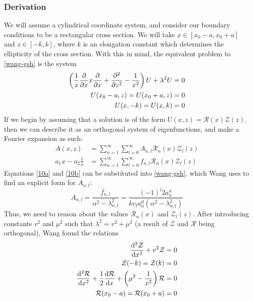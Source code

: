 \subsubsection{Derivation}
We will assume a cylindrical coordinate system, and consider our boundary conditions to be a rectangular cross section. We will 
take $x \in [x_0 - a, x_0 + a]$ and $z \in [-k, k]$, where $k$ is an elongation constant which determines the ellipticity of the cross section. 
With this in mind, the equivalent problem to \ref{wang-gsh} is the system
\begin{align}
    \label{4a} \left ( \frac{1}{x} \pdv{x} x \pdv{x} + \pdv[2]{z} - \frac{1}{x^2} \right ) U + \lambda^2 U &= 0 \\
    \label{4b} U(x_0 - a, z) = U(x_0 + a, z) &= 0 \\
    \label{4c} U(x, -k) = U(x, k) &= 0
\end{align}
If we begin by assuming that a solution is of the form $U(x,z) = \mathcal{R}(x) \mathcal{Z}(z)$, then we can describe it as an 
orthogonal system of eigenfunctions, and make a Fourier expansion as such:
\begin{align}
    \label{10a} A(x,z) &= \sum_{n = 1}^{\infty} \sum_{l = 0}^{\infty} A_{n,l} \mathcal{R}_n(x) \mathcal{Z}_l(z) \\
    \label{10b} a_1 x - a_2 \frac{1}{x} &= \sum_{n = 1}^{\infty} \sum_{l = 0}^{\infty} f_{n,l} \mathcal{R}_n(x) \mathcal{Z}_l(z)
\end{align}
Equations \ref{10a} and \ref{10b} can be substituted into \ref{wang-gsh}, which Wang uses to find an explicit form for $A_{n,l}$:
\begin{equation}
    \label{a-form} A_{n,l} = \frac{f_{n,l}}{\alpha^2 - \lambda_{n,l}^2} = \frac{(-1)^l 2a_n^u}{kv_l a_n^d (\alpha^2 - \lambda_{n,l}^2)}
\end{equation}
Thus, we need to reason about the values $\mathcal{R}_n(x)$ and  $\mathcal{Z}_l(z)$. 
After introducing constants $v^2$ and $\mu^2$ such that $\lambda^2 = v^2 + \mu^2$ (a result of $\mathcal{Z}$ and $\mathcal{R}$ being orthogonal), Wang found the relations
\begin{align}
    \label{5a} \dv[2]{\mathcal{Z}}{x} + v^2 \mathcal{Z} &= 0 \\
    \label{5b} \mathcal{Z}(-k) = \mathcal{Z}(k) &= 0 \\
    \label{5c} \dv[2]{\mathcal{R}}{x} + \frac{1}{2} \dv{\mathcal{R}}{x} + \left ( \mu^2 - \frac{1}{x^2} \right ) \mathcal{R} &= 0 \\
    \label{5d} \mathcal{R}(x_0 - a) = \mathcal{R}(x_0 + a) &= 0
\end{align}
